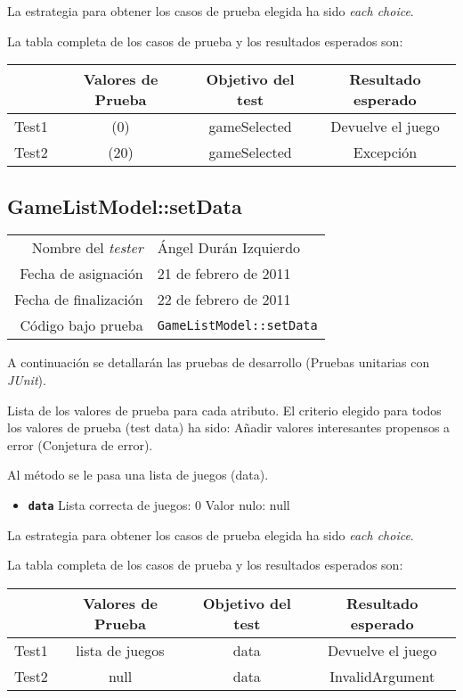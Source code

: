 La estrategia para obtener los casos de prueba elegida ha sido
\textit{each choice}.

La tabla completa de los casos de prueba y los resultados esperados son:

{\footnotesize
\begin{longtable}[c]{lccc}
 & \textbf{Valores de Prueba} & \textbf{Objetivo del test} & \textbf{Resultado esperado} \\
\hline \hline
\endhead

Test1 & (0) & gameSelected & Devuelve el juego\\
Test2 & (20) & gameSelected & Excepci\'on\\

\hline
\end{longtable}
}

\subsection{GameListModel::setData}

{\small
\begin{tabular}{r|l}
Nombre del \textit{tester} & \'Angel Dur\'an Izquierdo\\
Fecha de asignación & 21 de febrero de 2011 \\
Fecha de finalización & 22 de febrero de 2011 \\
Código bajo prueba & \texttt{GameListModel::setData}
\end{tabular}
}

A continuación se detallarán las pruebas de desarrollo (Pruebas unitarias con \textit{JUnit}).

Lista de los valores de prueba para cada atributo.
El criterio elegido para todos los valores de prueba (test data) ha sido: Añadir valores interesantes propensos a error (Conjetura de error).

Al m\'etodo se le pasa una lista de juegos (data).

\begin{itemize}
\item \textbf{\texttt{data}}
\subitem Lista correcta de juegos: 0
\subitem Valor nulo: null
\end{itemize}

La estrategia para obtener los casos de prueba elegida ha sido
\textit{each choice}.

La tabla completa de los casos de prueba y los resultados esperados son:

{\footnotesize
\begin{longtable}[c]{lccc}
 & \textbf{Valores de Prueba} & \textbf{Objetivo del test} & \textbf{Resultado esperado} \\
\hline \hline
\endhead

Test1 & lista de juegos & data & Devuelve el juego\\
Test2 & null & data & InvalidArgument\\

\hline
\end{longtable}
}

